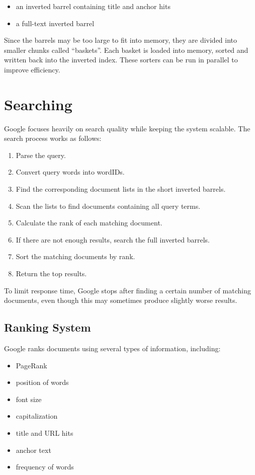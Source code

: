 \documentclass[10pt,a4paper]{article}
\begin{document}
\begin{itemize}
    \item an inverted barrel containing title and anchor hits
    \item a full-text inverted barrel
\end{itemize}

Since the barrels may be too large to fit into memory, they are divided into smaller chunks called ``baskets''. Each basket is loaded into memory, sorted and written back into the inverted index. These sorters can be run in parallel to improve efficiency.

\section{Searching}

Google focuses heavily on search quality while keeping the system scalable. The search process works as follows:

\begin{enumerate}
    \item Parse the query.
    \item Convert query words into wordIDs.
    \item Find the corresponding document lists in the short inverted barrels.
    \item Scan the lists to find documents containing all query terms.
    \item Calculate the rank of each matching document.
    \item If there are not enough results, search the full inverted barrels.
    \item Sort the matching documents by rank.
    \item Return the top results.
\end{enumerate}

To limit response time, Google stops after finding a certain number of matching documents, even though this may sometimes produce slightly worse results.

\subsection{Ranking System}

Google ranks documents using several types of information, including:

\begin{itemize}
    \item PageRank
    \item position of words
    \item font size
    \item capitalization
    \item title and URL hits
    \item anchor text
    \item frequency of words
\end{itemize}
\end{document}

